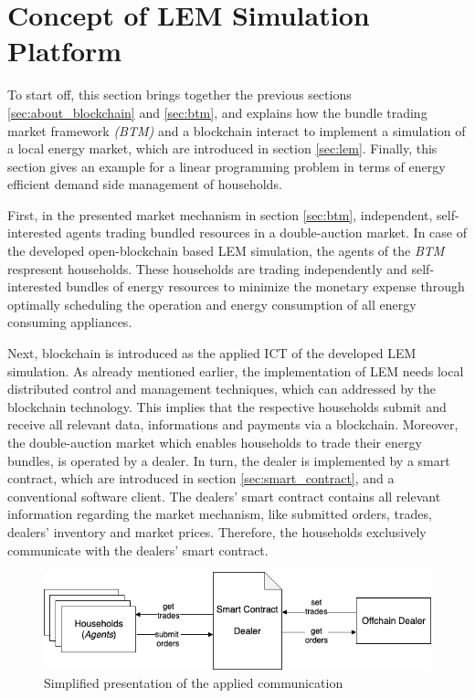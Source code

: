 \section{Concept of LEM Simulation Platform}
To start off, this section brings together the previous sections \ref{sec:about_blockchain} and \ref{sec:btm},
and explains how the bundle trading market framework \textit{(BTM)} and a blockchain interact to implement a simulation 
of a local energy market, which are introduced in section \ref{sec:lem}.
Finally, this section gives an example for a linear programming problem in terms of energy efficient demand side management of households. 

First, in the presented market mechanism in section \ref{sec:btm}, independent, self-interested agents trading bundled resources
in a double-auction market. 
In case of the developed open-blockchain based LEM simulation, the agents of the \textit{BTM} respresent households. 
These households are trading independently and self-interested bundles of energy resources 
to minimize the monetary expense through optimally scheduling the operation and energy consumption 
of all energy consuming appliances.

Next, blockchain is introduced as the applied ICT of the developed LEM simulation. 
As already mentioned earlier, the implementation of LEM needs 
local distributed control and management techniques, which can addressed by the blockchain technology.
This implies that the respective households submit and receive all relevant data, informations and payments via a blockchain. 
Moreover, the double-auction market which enables households to trade their energy bundles, is operated by a dealer.
In turn, the dealer is implemented by a smart contract, which are introduced in section \ref{sec:smart_contract}, and a conventional software client. 
The dealers' smart contract contains all relevant information regarding the market mechanism, like submitted orders, trades, 
dealers' inventory and market prices. 
Therefore, the households exclusively communicate with the dealers' smart contract. 

\begin{figure}[htbp]
	\centering
	\includegraphics[width=.7\linewidth]{./figures/concept_lem.png}
	\caption{Simplified presentation of the applied communication}
	\label{figure:concept_lem}
\end{figure}

